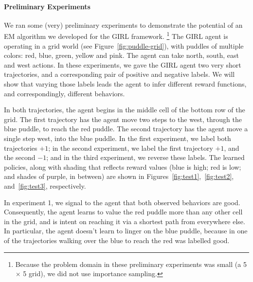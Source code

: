 
\vspace{\up}
\paragraph{Preliminary Experiments}

We ran some (very) preliminary experiments to demonstrate the
potential of an EM algorithm we developed for the GIRL framework.%
\footnote{Because the problem domain in these preliminary experiments
was small (a 5 $\times$ 5 grid), we did not use importance sampling.}
%
The GIRL agent is operating in a grid world (see
Figure~\ref{fig:puddle-grid}), with puddles of multiple colors: red,
blue, green, yellow and pink.  The agent can take north, south, east
and west actions.
In these experiments, we gave the GIRL agent two very short
trajectories, and a corresponding pair of positive and negative
labels.  We will show that varying those labels leads the agent to
infer different reward functions, and correspondingly, different
behaviors.

In both trajectories, the agent begins in the middle cell of the
bottom row of the grid.  The first trajectory has the agent move two
steps to the west, through the blue puddle, to reach the red puddle.
The second trajectory has the agent move a single step west, into the
blue puddle.
%
%
In the first experiment, we label both trajectories $+1$; in the
second experiment, we label the first trajectory $+1$, and the second
$-1$; and in the third experiment, we reverse these labels.  The
learned policies, along with shading that reflects reward values (blue
is high; red is low; and shades of purple, in between)
are shown in Figures~\ref{fig:test1},~\ref{fig:test2},
and~\ref{fig:test3}, respectively.

In experiment 1, we signal to the agent that both observed behaviors
are good.  Consequently, the agent learns to value the red puddle more
than any other cell in the grid, and is intent on reaching it via a
shortest path from everywhere else.  In particular, the agent doesn't
learn to linger on the blue puddle, because in one of the trajectories
walking over the blue to reach the red was labelled good.

